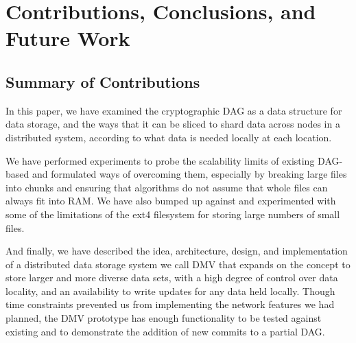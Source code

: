 \chapter{Contributions, Conclusions, and Future Work}


\section{Summary of Contributions}

In this paper, we have examined the cryptographic \acrfull{DAG} as a data
structure for data storage, and the ways that it can be sliced to shard data
across nodes in a distributed system, according to what data is needed locally
at each location.

We have performed experiments to probe the scalability limits of existing
\gls{DAG}-based  and formulated ways of overcoming them,
especially by breaking large files into chunks and ensuring that algorithms do
not assume that whole files can always fit into RAM. We have also bumped up
against and experimented with some of the limitations of the ext4 filesystem for
storing large numbers of small files.

And finally, we have described the idea, architecture, design, and
implementation of a distributed data storage system we call \gls{DMV} that
expands on the  concept to store
larger and more diverse data sets, with a high degree of control over data
locality, and an availability to write updates for any data held locally. Though
time constraints prevented us from implementing the network features we had
planned, the \gls{DMV} prototype has enough functionality to be tested against
existing  and to demonstrate the addition of new \glspl{commit}
to a partial \gls{DAG}.
